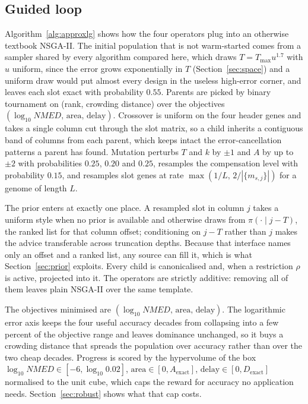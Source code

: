 \documentclass[acmsmall,review,anonymous]{acmart}
\newcommand{\nmed}{\textit{NMED}}
\begin{document}
\subsection{Guided loop}
\label{sec:loop}
Algorithm~\ref{alg:approxlg} shows how the four operators plug into an
otherwise textbook NSGA-II.  The initial population that is not warm-started
comes from a sampler shared by every algorithm compared here, which draws
$T=T_{\max}u^{1.7}$ with $u$ uniform, since the error grows exponentially in
$T$ (Section~\ref{sec:space}) and a
uniform draw would put almost every design in the useless high-error corner,
and leaves each slot exact with probability $0.55$.  Parents are picked by
binary tournament on (rank, crowding distance) over the objectives
$(\log_{10}\nmed{},\,\text{area},\,\text{delay})$.  Crossover is uniform on the
four header genes and takes a single column cut through the slot matrix, so a
child inherits a contiguous band of columns from each parent, which keeps
intact the error-cancellation patterns a parent has found.  Mutation perturbs
$T$ and $k$ by $\pm1$ and $A$ by up to $\pm2$ with probabilities $0.25$, $0.20$
and $0.25$, resamples the compensation level with probability $0.15$, and
resamples slot genes at rate $\max(1/L,\,2/|\{m_{s,j}\}|)$ for a genome of
length $L$.

The prior enters at exactly one place.  A resampled slot in column $j$ takes a
uniform style when no prior is available and otherwise draws from
$\pi(\cdot\mid j-T)$, the ranked list for that column offset; conditioning on
$j-T$ rather than $j$ makes the advice transferable across truncation depths.
Because that interface names only an offset and a ranked list, any source can
fill it, which is what Section~\ref{sec:prior} exploits.  Every child is
canonicalised and, when a restriction $\rho$ is active, projected into it.  The
operators are strictly additive: removing all of them leaves plain NSGA-II over
the same template.

The objectives minimised are $(\log_{10}\nmed{},\,\text{area},\,\text{delay})$.
The logarithmic error axis keeps the four useful accuracy decades from
collapsing into a few percent of the objective range and leaves dominance
unchanged, so it buys a crowding distance that spreads the population over
accuracy rather than over the two cheap decades.  Progress is scored by the
hypervolume of the box $\log_{10}\nmed\in[-6,\log_{10}0.02]$,
$\text{area}\in[0,A_{\mathrm{exact}}]$, $\text{delay}\in[0,D_{\mathrm{exact}}]$
normalised to the unit cube, which caps the reward for accuracy no application
needs.  Section~\ref{sec:robust} shows what that cap costs.
\end{document}
